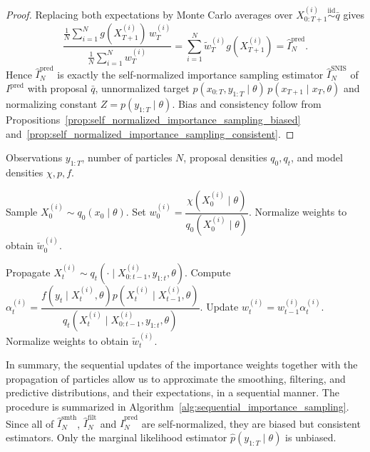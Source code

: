 \begin{proof}
    Replacing both expectations by Monte Carlo averages over $X_{0:T+1}^{(i)} \overset{\mathrm{iid}}{\sim} \bar{q}$ gives
    \begin{equation}
        \frac{\frac{1}{N}\sum_{i=1}^{N} g(X_{T+1}^{(i)})\, w_T^{(i)}}{\frac{1}{N}\sum_{i=1}^{N} w_T^{(i)}} = \sum_{i=1}^{N} \tilde{w}_T^{(i)} g(X_{T+1}^{(i)}) = \hat{I}_N^{\mathrm{pred}}.
    \end{equation}
    Hence $\hat{I}_N^{\mathrm{pred}}$ is exactly the self-normalized importance sampling estimator $\hat{I}_N^{\mathrm{SNIS}}$ of $I^{\mathrm{pred}}$ with proposal $\bar{q}$, unnormalized target $p(x_{0:T},y_{1:T}\mid\theta)\,p(x_{T+1}\mid x_T,\theta)$ and normalizing constant $Z = p(y_{1:T}\mid\theta)$.
    Bias and consistency follow from Propositions~\ref{prop:self_normalized_importance_sampling_biased} and~\ref{prop:self_normalized_importance_sampling_consistent}.
\end{proof}

\begin{algorithm}
\caption{Sequential importance sampling}
\label{alg:sequential_importance_sampling}
\begin{algorithmic}[1]
    \REQUIRE Observations $y_{1:T}$, number of particles $N$, proposal densities $q_0,q_t$, and model densities $\chi,p,f$.

        \STATE Sample $X_0^{(i)} \sim q_0(x_0 \mid \theta)$.
        \STATE Set $w_0^{(i)} = \dfrac{\chi(X_0^{(i)}\mid \theta)}{q_0(X_0^{(i)} \mid \theta)}$.
    \ENDFOR
    \STATE Normalize weights to obtain $\tilde{w}_0^{(i)}$.

            \STATE Propagate $X_t^{(i)} \sim q_t(\cdot\mid X_{0:t-1}^{(i)},y_{1:t},\theta)$.
            \STATE Compute $\alpha_t^{(i)} = \dfrac{f(y_t\mid X_t^{(i)}, \theta)p(X_t^{(i)}\mid X_{t-1}^{(i)}, \theta)}{q_t(X_t^{(i)}\mid X_{0:t-1}^{(i)},y_{1:t}, \theta)}$.
            \STATE Update $w_t^{(i)} = w_{t-1}^{(i)}\alpha_t^{(i)}$.
        \ENDFOR
        \STATE Normalize weights to obtain $\tilde{w}_t^{(i)}$.
    \ENDFOR
\end{algorithmic}
\end{algorithm}
In summary, the sequential updates of the importance weights together with the propagation of particles allow us to approximate the smoothing, filtering, and predictive distributions, and their expectations, in a sequential manner. The procedure is summarized in Algorithm~\ref{alg:sequential_importance_sampling}.
Since all of $\hat{I}_N^{\mathrm{smth}}$, $\hat{I}_N^{\mathrm{filt}}$ and $\hat{I}_N^{\mathrm{pred}}$ are self-normalized, they are biased but consistent estimators. Only the marginal likelihood estimator $\hat{p}(y_{1:T}\mid\theta)$ is unbiased.

